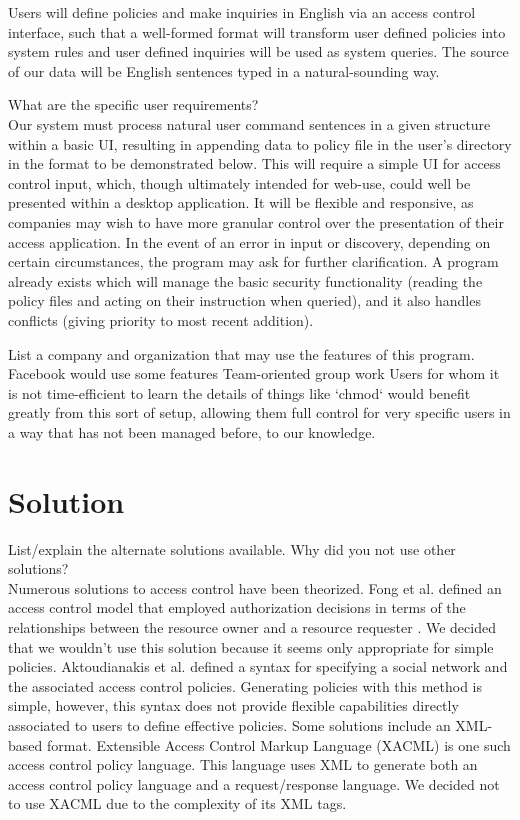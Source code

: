 \documentclass[12pt]{article}
\begin{document}
Users will define policies and make inquiries in English via an access control interface, such that a well-formed format will transform user defined policies into system rules and user defined inquiries will be used as system queries.
The source of our data will be English sentences typed in a natural-sounding way.

What are the specific user requirements? \\
Our system must process natural user command sentences in a given structure within a basic UI, resulting in appending data to policy file in the user's directory in the format to be demonstrated below.
This will require a simple UI for access control input, which, though ultimately intended for web-use, could well be presented within a desktop application.
It will be flexible and responsive, as companies may wish to have more granular control over the presentation of their access application.
In the event of an error in input or discovery, depending on certain circumstances, the program may ask for further clarification.
A program already exists which will manage the basic security functionality (reading the policy files and acting on their instruction when queried), and it also handles conflicts (giving priority to most recent addition).

List a company and organization that may use the features of this program. \\
Facebook would use some features
Team-oriented group work
Users for whom it is not time-efficient to learn the details of things like `chmod` would benefit greatly from this sort of setup, allowing them full control for very specific users in a way that has not been managed before, to our knowledge.

\section{Solution}

List/explain the alternate solutions available.  Why did you not use other solutions? \\
Numerous solutions to access control have been theorized. Fong et al. defined an access control model that employed authorization decisions in terms of the relationships between the resource owner and a resource requester \cite{fong11}. We decided that we wouldn’t use this solution because it seems only appropriate for simple policies. Aktoudianakis et al. defined a syntax for specifying a social network and the associated access control policies. Generating policies with this method is simple, however, this syntax does not provide flexible capabilities directly associated to users to define effective policies. \cite{aktoudianakis13} Some solutions include an XML-based format. Extensible Access Control Markup Language (XACML) is one such access control policy language. This language uses XML to generate both an access control policy language and a request/response language. We decided not to use XACML due to the complexity of its XML tags.
\end{document}
